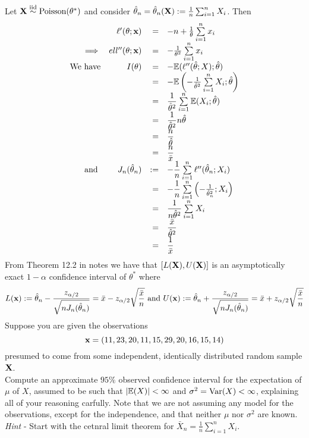 \documentclass[11pt,a4paper]{article}
\begin{document}
\ans
Let $\textbf{X}\overset{\text{iid}}{\sim}\text{Poisson}(\theta^*)$ and consider $\hat\theta_n=\hat\theta_n(\textbf{X}):=\frac{1}{n}\sum_{i=1}^nX_i$. Then
\[\begin{array}{rrrl}
&\ell'(\theta;\textbf{x})&=&-n+\frac{1}{\theta}\sum\limits_{i=1}^nx_i\\
\implies&ell''(\theta;\textbf{x})&=&-\frac{1}{\theta^2}\sum\limits_{i=1}^nx_i\\
\text{We have}&I(\theta)&=&-\mathbb{E}(\ell''(\hat\theta;X);\hat\theta)\\
&&=&-\mathbb{E}\left(-\frac{1}{\hat\theta^2}\sum\limits_{i=1}^nX_i;\hat\theta\right)\\
&&=&\dfrac{1}{\hat\theta^2}\sum\limits_{i=1}^n\mathbb{E}(X_i;\hat\theta)\\
&&=&\dfrac{1}{\hat\theta^2}n\hat\theta\\
&&=&\dfrac{n}{\hat\theta}\\
&&=&\dfrac{n}{\bar{x}}\\
\text{ and }&J_n(\hat\theta_n)&:=&-\dfrac{1}{n}\sum\limits_{i=1}^n\ell''(\hat\theta_n;X_i)\\
&&=&-\dfrac{1}{n}\sum\limits_{i=1}^n\left(-\frac{1}{\hat\theta_n^2};X_i\right)\\
&&=&\dfrac{1}{n\hat\theta^2}\sum\limits_{i=1}^nX_i\\
&&=&\dfrac{\bar x}{\hat\theta^2}\\
&&=&\dfrac{1}{\bar x}
\end{array}\]
From Theorem 12.2 in notes we have that $[L(\textbf{X}),U(\textbf{X})]$ is an asymptotically exact $1-\alpha$ confidence interval of $\theta^*$ where
$$L(\textbf{x}):=\hat\theta_n-\dfrac{z_{\alpha/2}}{\sqrt{nJ_n(\hat\theta_n)}}=\bar{x}-z_{\alpha/2}\sqrt{\frac{\bar{x}}{n}}\text{ and }U(\textbf{x}):=\hat\theta_n+\dfrac{z_{\alpha/2}}{\sqrt{nJ_n(\hat\theta_n)}}=\bar{x}+z_{\alpha/2}\sqrt{\frac{\bar{x}}{n}}$$
\question
Suppose you are given the observations
$$\textbf{x}=(11,23,20,11,15,29,20,16,15,14)$$
presumed to come from some independent, identically distributed random sample $\textbf{X}$.\\

\qpart
Compute an approximate $95\%$ observed confidence interval for the expectation of $\mu$ of $X$, assumed to be such that $|\mathbb{E}(X)|<\infty$ and $\sigma^2=\mathrm{Var}(X)<\infty$, explaining all of your reasoning carfully. Note that we are not assuming any model for the observations, except for the independence, and that neither $\mu$ nor $\sigma^2$ are known.\\
\textit{Hint} - Start with the cetnral limit theorem for $\bar{X}_n=\frac{1}{n}\sum_{i=1}^nX_i$.\\
\end{document}
